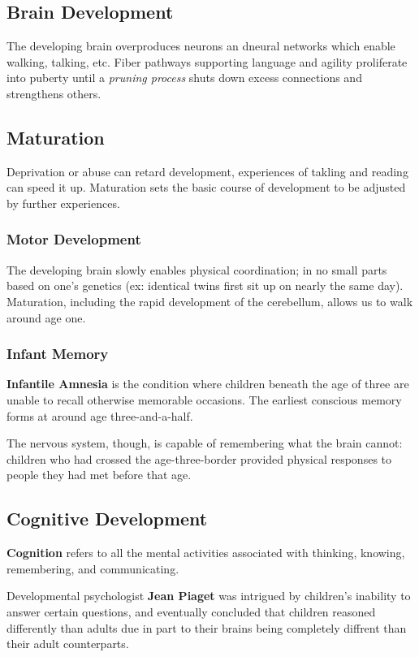 \documentclass[12pt]{article}
\begin{document}
\subsection*{Brain Development}
The developing brain overproduces neurons an dneural networks which enable walking, talking, etc. Fiber pathways supporting language and agility proliferate into puberty until a {\it pruning process} shuts down excess connections and strengthens others.

\subsection*{Maturation}
Deprivation or abuse can retard development, experiences of takling and reading can speed it up. Maturation sets the basic course of development to be adjusted by further experiences.

\subsubsection*{Motor Development}
The developing brain slowly enables physical coordination; in no small parts based on one's genetics (ex: identical twins first sit up on nearly the same day). Maturation, including the rapid development of the cerebellum, allows us to walk around age one.

\subsubsection*{Infant Memory}
{\bf Infantile Amnesia} is the condition where children beneath the age of three are unable to recall otherwise memorable occasions. The earliest conscious memory forms at around age three-and-a-half.

The nervous system, though, is capable of remembering what the brain cannot: children who had crossed the age-three-border provided physical responses to people they had met before that age.

\subsection*{Cognitive Development}
{\bf Cognition} refers to all the mental activities associated with thinking, knowing, remembering, and communicating.

Developmental psychologist {\bf Jean Piaget} was intrigued by children's inability to answer certain questions, and eventually concluded that children reasoned differently than adults due in part to their brains being completely diffrent than their adult counterparts.
\end{document}
